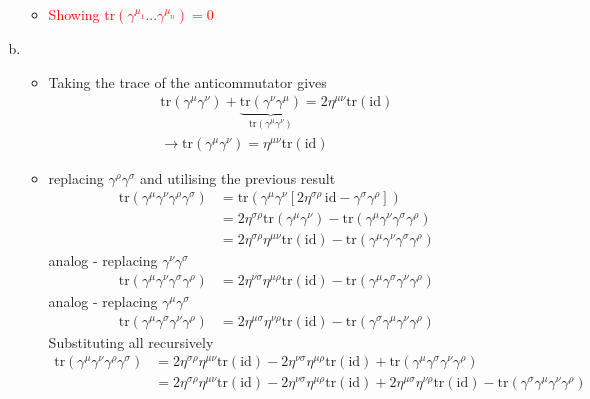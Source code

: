 \documentclass[../main.tex]{subfiles}
\begin{document}
\begin{enumerate}[a)]
\begin{itemize}
\item \textcolor{red}{Showing $\text{tr}(\gamma^{\mu_1}...\gamma^{\mu_n})=0$}


\end{itemize}

\item 
\begin{itemize}
\item Taking the trace of the anticommutator gives
\begin{align}
\text{tr}(\gamma^\mu\gamma^\nu)+\underbrace{\text{tr}(\gamma^\nu\gamma^\mu)}_{\text{tr}(\gamma^\mu\gamma^\nu)}=2\eta^{\mu\nu}\text{tr}(\text{id})\\
\rightarrow\text{tr}(\gamma^\mu\gamma^\nu)=\eta^{\mu\nu}\text{tr}(\text{id})
\end{align}
\item replacing $\gamma^\rho\gamma^\sigma$ and utilising the previous result
\begin{align}
\text{tr}(\gamma^\mu\gamma^\nu\gamma^\rho\gamma^\sigma)
&=\text{tr}(\gamma^\mu\gamma^\nu[2\eta^{\sigma\rho}\,\text{id}-\gamma^\sigma\gamma^\rho])\\
&=2\eta^{\sigma\rho}\text{tr}(\gamma^\mu\gamma^\nu)-
\text{tr}(\gamma^\mu\gamma^\nu\gamma^\sigma\gamma^\rho)\\
&=2\eta^{\sigma\rho}\eta^{\mu\nu}\text{tr}(\text{id})-
\text{tr}(\gamma^\mu\gamma^\nu\gamma^\sigma\gamma^\rho)
\end{align}
analog - replacing $\gamma^\nu\gamma^\sigma$
\begin{align}
\text{tr}(\gamma^\mu\gamma^\nu\gamma^\sigma\gamma^\rho)
&=2\eta^{\nu\sigma}\eta^{\mu\rho}\text{tr}(\text{id})-\text{tr}(\gamma^\mu\gamma^\sigma\gamma^\nu\gamma^\rho)
\end{align}
analog - replacing $\gamma^\mu\gamma^\sigma$
\begin{align}
\text{tr}(\gamma^\mu\gamma^\sigma\gamma^\nu\gamma^\rho)&=
2\eta^{\mu\sigma}\eta^{\nu\rho}\text{tr}(\text{id})-\text{tr}(\gamma^\sigma\gamma^\mu\gamma^\nu\gamma^\rho)
\end{align}
Substituting all recursively
\begin{align}
\text{tr}(\gamma^\mu\gamma^\nu\gamma^\rho\gamma^\sigma)
&=2\eta^{\sigma\rho}\eta^{\mu\nu}\text{tr}(\text{id})-2\eta^{\nu\sigma}\eta^{\mu\rho}\text{tr}(\text{id})+\text{tr}(\gamma^\mu\gamma^\sigma\gamma^\nu\gamma^\rho)\\
&=2\eta^{\sigma\rho}\eta^{\mu\nu}\text{tr}(\text{id})-2\eta^{\nu\sigma}\eta^{\mu\rho}\text{tr}(\text{id})+2\eta^{\mu\sigma}\eta^{\nu\rho}\text{tr}(\text{id})-\text{tr}(\gamma^\sigma\gamma^\mu\gamma^\nu\gamma^\rho)\\

\end{align}
\end{itemize}
\end{enumerate}
\end{document}
